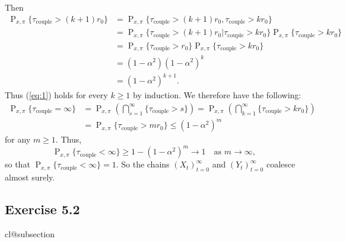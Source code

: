 \documentclass[12pt]{article}
\makeatletter
\def\nullstepcounter#1{%
	\begingroup
		\let\@elt\@stpelt
		\csname cl@#1\endcsname
	\endgroup}
\DeclareMathOperator{\Prob}{P}
\makeatother
\begin{document}
\begin{enumerate}[label=(\alph*)]
Then
\begin{align*}
\Prob_{x, \pi}\{\tau_\mathrm{couple} > (k+1)r_0\} &= \Prob_{x, \pi}\{\tau_\mathrm{couple} > (k+1)r_0, \tau_\mathrm{couple} > kr_0\} \\
&= \Prob_{x, \pi}\{\tau_\mathrm{couple} > (k+1)r_0 | \tau_\mathrm{couple} > kr_0\} \Prob_{x, \pi}\{\tau_\mathrm{couple} > kr_0\} \\
&= \Prob_{x, \pi}\{\tau_\mathrm{couple} > r_0\} \Prob_{x, \pi}\{\tau_\mathrm{couple} > kr_0\} \\
&= (1 - \alpha^2)(1 - \alpha^2)^k \\
&= (1 - \alpha^2)^{k+1}.
\end{align*}
Thus (\ref{eq:1}) holds for every $k \geq 1$ by induction. We therefore have the following:
\begin{align*}
\Prob_{x, \pi}\{\tau_\mathrm{couple} = \infty\} &= \Prob_{x, \pi}\left(\bigcap_{s=1}^\infty \{\tau_\mathrm{couple} > s\}\right) = \Prob_{x, \pi}\left(\bigcap_{k=1}^\infty \{\tau_\mathrm{couple} > kr_0\}\right) \\
&= \Prob_{x, \pi}\{\tau_\mathrm{couple} > mr_0\} \leq (1 - \alpha^2)^m
\end{align*}
for any $m \geq 1$. Thus,
\begin{equation*}
\Prob_{x, \pi}\{\tau_\mathrm{couple} < \infty\} \geq 1 - (1 - \alpha^2)^m \to 1 \quad \text{as $m \to \infty$},
\end{equation*}
so that $\Prob_{x, \pi}\{\tau_\mathrm{couple} < \infty\} = 1$. So the chains $(X_t)_{t=0}^\infty$ and $(Y_t)_{t=0}^\infty$ coalesce almost surely.

\end{enumerate}

\subsection*{Exercise 5.2}
\nullstepcounter{subsection}
\end{document}
